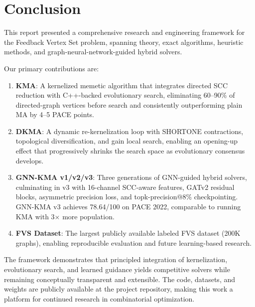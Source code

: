 \documentclass[10pt,a4paper]{report}
\theoremstyle{definition}
\begin{document}
\chapter{Conclusion}
\label{ch:conclusion}

This report presented a comprehensive research and engineering framework for the Feedback Vertex Set problem, spanning theory, exact algorithms, heuristic methods, and graph-neural-network-guided hybrid solvers.

Our primary contributions are:

\begin{enumerate}
	\item \textbf{KMA}: A kernelized memetic algorithm that integrates directed SCC reduction with C++-backed evolutionary search, eliminating 60--90\% of directed-graph vertices before search and consistently outperforming plain MA by 4--5 PACE points.

	\item \textbf{DKMA}: A dynamic re-kernelization loop with SHORTONE contractions, topological diversification, and gain local search, enabling an opening-up effect that progressively shrinks the search space as evolutionary consensus develops.

	\item \textbf{GNN-KMA v1/v2/v3}: Three generations of GNN-guided hybrid solvers, culminating in v3 with 16-channel SCC-aware features, GATv2 residual blocks, asymmetric precision loss, and topk-precision@8\% checkpointing. GNN-KMA v3 achieves 78.64/100 on PACE 2022, comparable to running KMA with 3$\times$ more population.

	\item \textbf{FVS Dataset}: The largest publicly available labeled FVS dataset (200K graphs), enabling reproducible evaluation and future learning-based research.
\end{enumerate}

The framework demonstrates that principled integration of kernelization, evolutionary search, and learned guidance yields competitive solvers while remaining conceptually transparent and extensible. The code, datasets, and weights are publicly available at the project repository, making this work a platform for continued research in combinatorial optimization.
\end{document}
